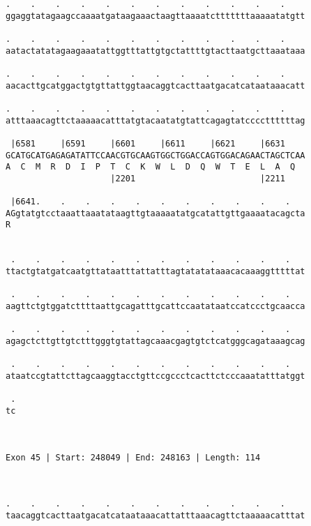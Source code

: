 \documentclass{article}
\begin{document}
\begin{Verbatim}
.    .    .    .    .    .    .    .    .    .    .    .    
ggaggtatagaagccaaaatgataagaaactaagttaaaatctttttttaaaaatatgtt
                                                            
.    .    .    .    .    .    .    .    .    .    .    .    
aatactatatagaagaaatattggtttattgtgctattttgtacttaatgcttaaataaa
                                                            
.    .    .    .    .    .    .    .    .    .    .    .    
aacacttgcatggactgtgttattggtaacaggtcacttaatgacatcataataaacatt
                                                            
.    .    .    .    .    .    .    .    .    .    .    .    
atttaaacagttctaaaaacatttatgtacaatatgtattcagagtatccccttttttag
                                                            
 |6581     |6591     |6601     |6611     |6621     |6631    
GCATGCATGAGAGATATTCCAACGTGCAAGTGGCTGGACCAGTGGACAGAACTAGCTCAA
A  C  M  R  D  I  P  T  C  K  W  L  D  Q  W  T  E  L  A  Q  
                     |2201                         |2211    
  
 |6641.    .    .    .    .    .    .    .    .    .    .   
AGgtatgtcctaaattaaatataagttgtaaaaatatgcatattgttgaaaatacagcta
R                                                           
                                                            
  
 .    .    .    .    .    .    .    .    .    .    .    .   
ttactgtatgatcaatgttataatttattatttagtatatataaacacaaaggtttttat
                                                            
 .    .    .    .    .    .    .    .    .    .    .    .   
aagttctgtggatcttttaattgcagatttgcattccaatataatccatccctgcaacca
                                                            
 .    .    .    .    .    .    .    .    .    .    .    .   
agagctcttgttgtctttgggtgtattagcaaacgagtgtctcatgggcagataaagcag
                                                            
 .    .    .    .    .    .    .    .    .    .    .    .   
ataatccgtattcttagcaaggtacctgttccgccctcacttctcccaaatatttatggt
                                                            
 .
tc
  
  
 
Exon 45 | Start: 248049 | End: 248163 | Length: 114



.    .    .    .    .    .    .    .    .    .    .    .    
taacaggtcacttaatgacatcataataaacattatttaaacagttctaaaaacatttat
                                                            

\end{Verbatim}
\end{document}
